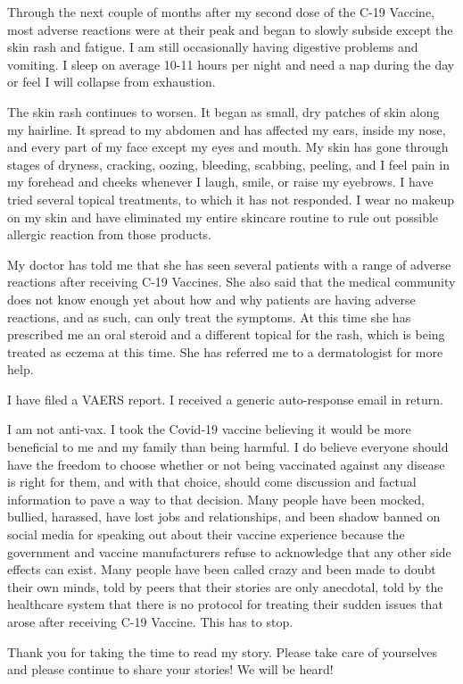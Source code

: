 Through the next couple of months after my second dose of the C-19 Vaccine, most
adverse reactions were at their peak and began to slowly subside except the skin
rash and fatigue. I am still occasionally having digestive problems and
vomiting. I sleep on average 10-11 hours per night and need a nap during the day
or feel I will collapse from exhaustion.

The skin rash continues to worsen. It began as small, dry patches of skin along
my hairline. It spread to my abdomen and has affected my ears, inside my nose,
and every part of my face except my eyes and mouth. My skin has gone through
stages of dryness, cracking, oozing, bleeding, scabbing, peeling, and I feel
pain in my forehead and cheeks whenever I laugh, smile, or raise my eyebrows. I
have tried several topical treatments, to which it has not responded. I wear no
makeup on my skin and have eliminated my entire skincare routine to rule out
possible allergic reaction from those products.

My doctor has told me that she has seen several patients with a range of adverse
reactions after receiving C-19 Vaccines. She also said that the medical
community does not know enough yet about how and why patients are having adverse
reactions, and as such, can only treat the symptoms. At this time she has
prescribed me an oral steroid and a different topical for the rash, which is
being treated as eczema at this time. She has referred me to a dermatologist for
more help.

I have filed a VAERS report. I received a generic auto-response email in return.

I am not anti-vax. I took the Covid-19 vaccine believing it would be more
beneficial to me and my family than being harmful. I do believe everyone should
have the freedom to choose whether or not being vaccinated against any disease
is right for them, and with that choice, should come discussion and factual
information to pave a way to that decision. Many people have been mocked,
bullied, harassed, have lost jobs and relationships, and been shadow banned on
social media for speaking out about their vaccine experience because the
government and vaccine manufacturers refuse to acknowledge that any other side
effects can exist. Many people have been called crazy and been made to doubt
their own minds, told by peers that their stories are only anecdotal, told by
the healthcare system that there is no protocol for treating their sudden issues
that arose after receiving C-19 Vaccine. This has to stop.

Thank you for taking the time to read my story. Please take care of yourselves
and please continue to share your stories! We will be heard!


